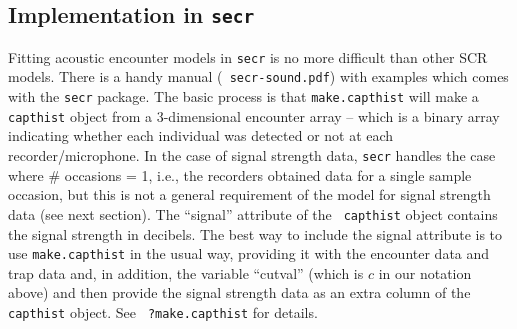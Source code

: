 \subsection{Implementation in \mbox{\tt secr}}

Fitting acoustic encounter models in \mbox{\tt secr} is no more
difficult than other SCR models. There is a handy manual (\mbox{\tt
  secr-sound.pdf}) with examples \citep{efford_dawson:2010} which
comes with the \mbox{\tt secr} package.  The basic process is that
\mbox{\tt make.capthist} will make a \mbox{\tt capthist} object from a
3-dimensional 
encounter array -- which is a binary array indicating whether each
individual was detected or not at each recorder/microphone. In the
case of signal strength data, \mbox{\tt secr} handles the case  where \#
occasions = 1, i.e., the recorders obtained
data for a single sample occasion, but this is not a general requirement of the
model for signal strength data (see next section).  The ``signal'' attribute of the \mbox{\tt
  capthist} object contains the signal strength in decibels.  The best
way to include the signal attribute is to use \mbox{\tt make.capthist}
in the usual way, providing it with the encounter data and trap data
and, in addition, the variable ``cutval'' (which is $c$ in our
notation above) and then provide the signal strength data as an extra
column of the \mbox{\tt capthist} object.  See \mbox{\tt
  ?make.capthist} for details.

